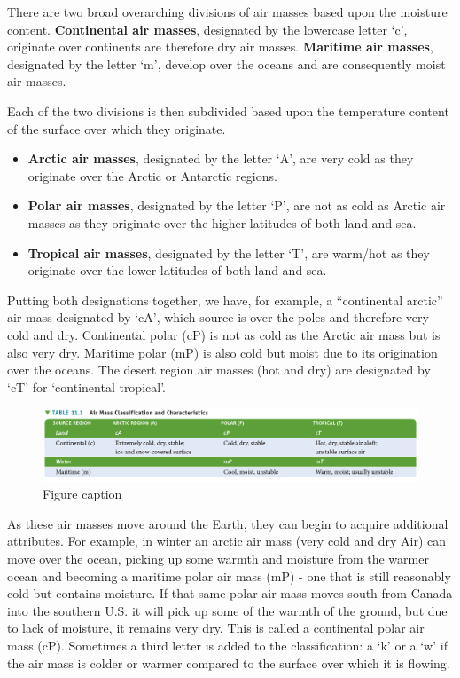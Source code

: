 \documentclass[12pt,oneside]{book}
\providecommand{\tightlist}{%
  \setlength{\itemsep}{0pt}\setlength{\parskip}{0pt}}
\begin{document}
There are two broad overarching divisions of air masses based upon the
moisture content. \textbf{Continental air masses}, designated by the
lowercase letter `c', originate over continents are therefore dry air
masses. \textbf{Maritime air masses}, designated by the letter `m',
develop over the oceans and are consequently moist air masses.

Each of the two divisions is then subdivided based upon the temperature
content of the surface over which they originate.

\begin{itemize}
\tightlist
\item
  \textbf{Arctic air masses}, designated by the letter `A', are very
  cold as they originate over the Arctic or Antarctic regions.
\item
  \textbf{Polar air masses}, designated by the letter `P', are not as
  cold as Arctic air masses as they originate over the higher latitudes
  of both land and sea.
\item
  \textbf{Tropical air masses}, designated by the letter `T', are
  warm/hot as they originate over the lower latitudes of both land and
  sea.
\end{itemize}

Putting both designations together, we have, for example, a
``continental arctic'' air mass designated by `cA', which source is over
the poles and therefore very cold and dry. Continental polar (cP) is not
as cold as the Arctic air mass but is also very dry. Maritime polar (mP)
is also cold but moist due to its origination over the oceans. The
desert region air masses (hot and dry) are designated by `cT' for
`continental tropical'.

\begin{figure}

{\centering \includegraphics[width=0.8\linewidth]{figures/Figure611} 

}

\caption{Figure caption}\label{fig:Fig611}
\end{figure}

As these air masses move around the Earth, they can begin to acquire
additional attributes. For example, in winter an arctic air mass (very
cold and dry Air) can move over the ocean, picking up some warmth and
moisture from the warmer ocean and becoming a maritime polar air mass
(mP) - one that is still reasonably cold but contains moisture. If that
same polar air mass moves south from Canada into the southern U.S. it
will pick up some of the warmth of the ground, but due to lack of
moisture, it remains very dry. This is called a continental polar air
mass (cP). Sometimes a third letter is added to the classification: a
`k' or a `w' if the air mass is colder or warmer compared to the surface
over which it is flowing.
\end{document}
